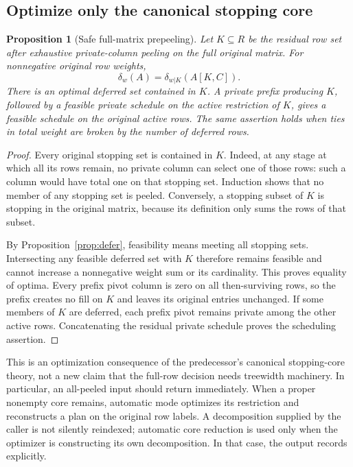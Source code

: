 \documentclass[11pt]{article}
\newtheorem{proposition}[theorem]{Proposition}
\theoremstyle{definition}\newtheorem{definition}[theorem]{Definition}
\theoremstyle{remark}\newtheorem{remark}[theorem]{Remark}
\newcommand{\code}[1]{\texttt{\detokenize{#1}}}
\begin{document}
\subsection{Optimize only the canonical stopping core}
\begin{proposition}[Safe full-matrix prepeeling]
\label{prop:prepeel}
Let $K\subseteq R$ be the residual row set after exhaustive private-column peeling on the full original matrix. For nonnegative original row weights,
\[
 \delta_w(A)=\delta_{w|K}(A[K,C]).
\]
There is an optimal deferred set contained in $K$. A private prefix producing $K$, followed by a feasible private schedule on the active restriction of $K$, gives a feasible schedule on the original active rows. The same assertion holds when ties in total weight are broken by the number of deferred rows.
\end{proposition}
\begin{proof}
Every original stopping set is contained in $K$. Indeed, at any stage at which all its rows remain, no private column can select one of those rows: such a column would have total one on that stopping set. Induction shows that no member of any stopping set is peeled. Conversely, a stopping subset of $K$ is stopping in the original matrix, because its definition only sums the rows of that subset.

By Proposition~\ref{prop:defer}, feasibility means meeting all stopping sets. Intersecting any feasible deferred set with $K$ therefore remains feasible and cannot increase a nonnegative weight sum or its cardinality. This proves equality of optima. Every prefix pivot column is zero on all then-surviving rows, so the prefix creates no fill on $K$ and leaves its original entries unchanged. If some members of $K$ are deferred, each prefix pivot remains private among the other active rows. Concatenating the residual private schedule proves the scheduling assertion.
\end{proof}

This is an optimization consequence of the predecessor's canonical stopping-core theory, not a new claim that the full-row decision needs treewidth machinery. In particular, an all-peeled input should return immediately. When a proper nonempty core remains, automatic mode optimizes its restriction and reconstructs a plan on the original row labels. A decomposition supplied by the caller is not silently reindexed; automatic core reduction is used only when the optimizer is constructing its own decomposition. In that case, the output records \code{decomposition_scope_rows} explicitly.
\end{document}
